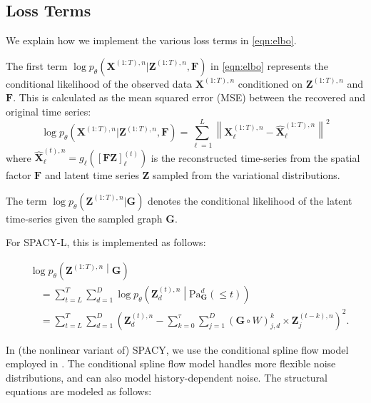 \subsection{Loss Terms}
We explain how we implement the various loss terms in \eqref{eqn:elbo}.

The first term $ \displaystyle {\log p_{\theta}\left( \mathbf{X}^{(1:T), n} | \mathbf{Z}^{(1:T), n}, \mathbf{F} \right)}$ in \eqref{eqn:elbo} represents the conditional likelihood of the observed data $\mathbf{X}^{(1:T), n}$ conditioned on $\mathbf{Z}^{(1:T), n}$ and $\mathbf{F}$. This is calculated as the mean squared error (MSE) between the recovered and original time series:
\begin{equation*}
    \displaystyle {\log p_{\theta}\left( \mathbf{X}^{(1:T), n} | \mathbf{Z}^{(1:T), n}, \mathbf{F} \right)} = \sum_{\ell=1}^L \left\lVert \mathbf{X}^{(1:T), n}_\ell - \widehat{\mathbf{X}}^{(1:T), n}_\ell\right\rVert^2
\end{equation*}
where $\displaystyle \widehat{\mathbf{X}}_\ell^{(t), n} = g_\ell \left( \left[ \mathbf{F}\mathbf{Z} \right]_\ell^{(t)} \right)$ is the reconstructed time-series from the spatial factor $\mathbf{F}$ and latent time series $\mathbf{Z}$ sampled from the variational distributions. 

The term $\displaystyle \log p_{\theta}\left(\mathbf{Z}^{(1:T), n} | \mathbf{G} \right)$ denotes the conditional likelihood of the latent time-series given the sampled graph $\mathbf{G}$. 

For SPACY-L, this is implemented as follows:

\begin{align}
    &\log p_\theta \left(\mathbf{Z}^{(1:T), n} \middle|  \mathbf{G} \right) \\ &\quad= \sum_{t=L}^T \sum_{d=1}^D \log p_\theta \left(\mathbf{Z}^{(t), n}_d \middle|  \text{Pa}_{\mathbf{G}}^d(\leq t)\right) \nonumber \\ &\quad= \sum_{t=L}^T \sum_{d=1}^D  \left(\mathbf{Z}^{(t),n}_d - \sum_{k=0}^{\tau} \sum_{j=1}^D \left(\mathbf{G} \circ {W} \right)_{j, d}^k \times
      \mathbf{Z}^{(t-k), n}_j \right)^2 \nonumber.
\end{align}


In (the nonlinear variant of) SPACY, we use the conditional spline flow model employed in \citet{durkan2019neural, gong2022rhino}. The conditional spline flow model handles more flexible noise distributions, and can also model history-dependent noise. The structural equations are modeled as follows:

